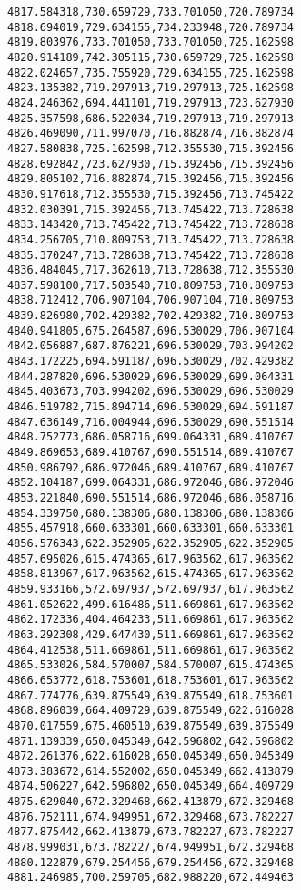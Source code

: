 \documentclass[11pt]{article}
\begin{document}
\begin{Verbatim}[commandchars=\\\{\}]
4817.584318,730.659729,733.701050,720.789734
4818.694019,729.634155,734.233948,720.789734
4819.803976,733.701050,733.701050,725.162598
4820.914189,742.305115,730.659729,725.162598
4822.024657,735.755920,729.634155,725.162598
4823.135382,719.297913,719.297913,725.162598
4824.246362,694.441101,719.297913,723.627930
4825.357598,686.522034,719.297913,719.297913
4826.469090,711.997070,716.882874,716.882874
4827.580838,725.162598,712.355530,715.392456
4828.692842,723.627930,715.392456,715.392456
4829.805102,716.882874,715.392456,715.392456
4830.917618,712.355530,715.392456,713.745422
4832.030391,715.392456,713.745422,713.728638
4833.143420,713.745422,713.745422,713.728638
4834.256705,710.809753,713.745422,713.728638
4835.370247,713.728638,713.745422,713.728638
4836.484045,717.362610,713.728638,712.355530
4837.598100,717.503540,710.809753,710.809753
4838.712412,706.907104,706.907104,710.809753
4839.826980,702.429382,702.429382,710.809753
4840.941805,675.264587,696.530029,706.907104
4842.056887,687.876221,696.530029,703.994202
4843.172225,694.591187,696.530029,702.429382
4844.287820,696.530029,696.530029,699.064331
4845.403673,703.994202,696.530029,696.530029
4846.519782,715.894714,696.530029,694.591187
4847.636149,716.004944,696.530029,690.551514
4848.752773,686.058716,699.064331,689.410767
4849.869653,689.410767,690.551514,689.410767
4850.986792,686.972046,689.410767,689.410767
4852.104187,699.064331,686.972046,686.972046
4853.221840,690.551514,686.972046,686.058716
4854.339750,680.138306,680.138306,680.138306
4855.457918,660.633301,660.633301,660.633301
4856.576343,622.352905,622.352905,622.352905
4857.695026,615.474365,617.963562,617.963562
4858.813967,617.963562,615.474365,617.963562
4859.933166,572.697937,572.697937,617.963562
4861.052622,499.616486,511.669861,617.963562
4862.172336,404.464233,511.669861,617.963562
4863.292308,429.647430,511.669861,617.963562
4864.412538,511.669861,511.669861,617.963562
4865.533026,584.570007,584.570007,615.474365
4866.653772,618.753601,618.753601,617.963562
4867.774776,639.875549,639.875549,618.753601
4868.896039,664.409729,639.875549,622.616028
4870.017559,675.460510,639.875549,639.875549
4871.139339,650.045349,642.596802,642.596802
4872.261376,622.616028,650.045349,650.045349
4873.383672,614.552002,650.045349,662.413879
4874.506227,642.596802,650.045349,664.409729
4875.629040,672.329468,662.413879,672.329468
4876.752111,674.949951,672.329468,673.782227
4877.875442,662.413879,673.782227,673.782227
4878.999031,673.782227,674.949951,672.329468
4880.122879,679.254456,679.254456,672.329468
4881.246985,700.259705,682.988220,672.449463

\end{Verbatim}
\end{document}
